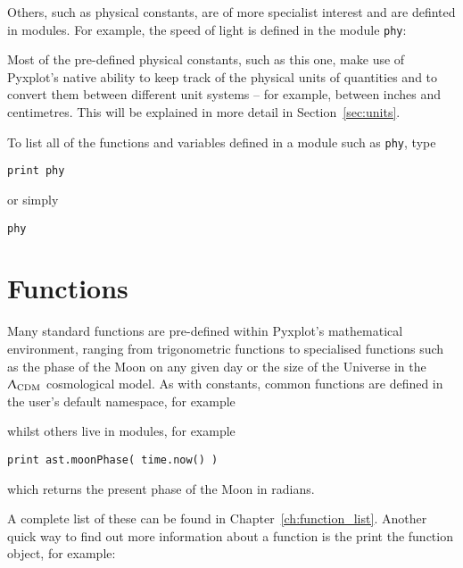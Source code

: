 \noindent Others, such as physical constants, are of more specialist interest and are
definted in modules. For example, the speed of light is defined in the module
{\tt phy}:

\vspace{3mm}

\vspace{3mm}

Most of the pre-defined physical constants, such as this one, make use of
Pyxplot's native ability to keep track of the physical units of quantities and
to convert them between different unit systems -- for example, between inches
and centimetres.  This will be explained in more detail in
Section~\ref{sec:units}.

To list all of the functions and variables defined in a module such as {\tt phy}, type

\begin{verbatim}
print phy
\end{verbatim}

\noindent or simply

\begin{verbatim}
phy
\end{verbatim}


\section{Functions} \label{sec:functions}

Many standard functions are pre-defined within Pyxplot's
mathematical environment, ranging from trigonometric functions to
specialised functions such as the phase of the Moon on any given day or the
size of the Universe in the $\Uplambda_\mathrm{CDM}$ cosmological model. As with constants, common functions
are defined in the user's default namespace, for example

\vspace{3mm}

\vspace{3mm}

\noindent whilst others live in modules, for example

\begin{verbatim}
print ast.moonPhase( time.now() )
\end{verbatim}

\noindent which returns the present phase of the Moon in radians.

A complete list of these can be found in Chapter~\ref{ch:function_list}.
Another quick way to find out more information about a function is the print
the function object, for example:

